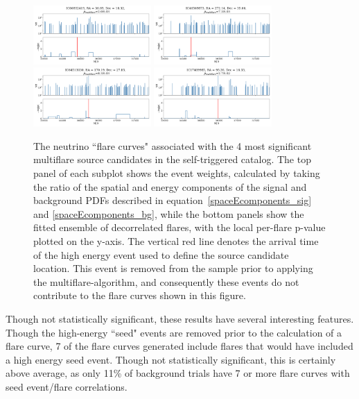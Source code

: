 \begin{figure}[h]
\centering
\includegraphics[width=0.4\textwidth]{figs/66932419.png}
\includegraphics[width=0.4\textwidth]{figs/46569873.png}
\includegraphics[width=0.4\textwidth]{figs/64513030.png}
\includegraphics[width=0.4\textwidth]{figs/17469985.png}
\caption{The neutrino ``flare curves" associated with the 4 most significant multiflare source candidates in the self-triggered catalog. The top panel of each subplot shows the event weights, calculated by taking the ratio of the spatial and energy components of the signal and background PDFs described in equation~\ref{spaceEcomponents_sig} and \ref{spaceEcomponents_bg}, while the bottom panels show the fitted ensemble of decorrelated flares, with the local per-flare p-value plotted on the y-axis. The vertical red line denotes the arrival time of the high energy event used to define the source candidate location. This event is removed from the sample prior to applying the multiflare-algorithm, and consequently these events do not contribute to the flare curves shown in this figure.}
\label{fig:stcurves}
\end{figure}


Though not statistically significant, these results have several interesting features. Though the high-energy ``seed" events are removed prior to the calculation of a flare curve, 7 of the flare curves generated include flares that would have included a high energy seed event. Though not statistically significant, this is certainly above average, as only 11\% of background trials have 7 or more flare curves with seed event/flare correlations. 


